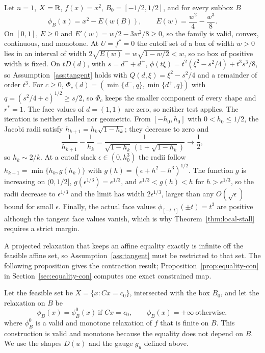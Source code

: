 \begin{example}\label{ex:critical-scalar}
Let $n=1$, $X=\mathbb{R}$, $f(x)=x^2$, $B_0=[-1/2,1/2]$, and for every subbox $B$
\[
  \phi_B(x)=x^2-E(w(B)),\qquad E(w)=\frac{w^2}{4}-\frac{w^3}{8}.
\]
On $[0,1]$, $E\ge0$ and $E'(w)=w/2-3w^2/8\ge0$, so the family is valid,
convex, continuous, and monotone. At $U=f^*=0$ the cutoff set of a box of
width $w>0$ lies in an interval of width $2\sqrt{E(w)}=w\sqrt{1-w/2}<w$, so no
box of positive width is fixed. On $tD(d)$, with $s=d^-+d^+$,
$\phi(t\xi)=t^2(\xi^2-s^2/4)+t^3s^3/8$, so Assumption~\ref{ass:tangent} holds
with $Q(d,\xi)=\xi^2-s^2/4$ and a remainder of order $t^3$. For $c\ge0$,
$\Phi_c(d)=(\min\{d^-,q\},\min\{d^+,q\})$ with $q=(s^2/4+c)^{1/2}\ge s/2$,
so $\Phi_c$ keeps the smaller component of every shape and $r^*=1$. The face
values of $d=(1,1)$ are zero, so neither test applies. The iteration is
neither stalled nor geometric. From $[-h_0,h_0]$ with $0<h_0\le1/2$, the
Jacobi radii satisfy $h_{k+1}=h_k\sqrt{1-h_k}$; they decrease to zero and
\[
  \frac1{h_{k+1}}-\frac1{h_k}=\frac{1}{\sqrt{1-h_k}\,(1+\sqrt{1-h_k})}\to\frac12,
\]
so $h_k\sim2/k$. At a cutoff slack $\epsilon\in(0,h_0^3)$ the radii follow
$h_{k+1}=\min\{h_k,g(h_k)\}$ with $g(h)=(\epsilon+h^2-h^3)^{1/2}$. The function
$g$ is increasing on $(0,1/2]$, $g(\epsilon^{1/3})=\epsilon^{1/3}$, and
$\epsilon^{1/3}<g(h)<h$ for $h>\epsilon^{1/3}$, so the radii decrease to
$\epsilon^{1/3}$ and the limit has width $2\epsilon^{1/3}$, larger than any
$O(\sqrt\epsilon)$ bound for small $\epsilon$. Finally, the actual face
values $\phi_{[-t,t]}(\pm t)=t^3$ are positive although the tangent face
values vanish, which is why Theorem~\ref{thm:local-stall} requires a strict
margin.
\end{example}

\begin{remark}\label{rem:linear-equations}
A projected relaxation that keeps an affine equality exactly is infinite off
the feasible affine set, so Assumption~\ref{ass:tangent} must be restricted
to that set. The following proposition gives the contraction result;
Proposition~\ref{prop:equality-con} in Section~\ref{sec:equality-con}
computes one exact constrained map.
\end{remark}

Let the feasible
set be $X=\{x:Cx=c_0\}$, intersected with the box $B_0$, and let the
relaxation on $B$ be
\[
 \phi_B(x)=\phi_B^0(x)\ \text{if }Cx=c_0,\qquad
 \phi_B(x)=+\infty\ \text{otherwise},
\]
where $\phi_B^0$ is a valid and monotone relaxation of $f$ that is finite
on $B$. This construction is valid and monotone because the equality does
not depend on $B$. We use the shapes $D(u)$ and the gauge $g_u$ defined above.

